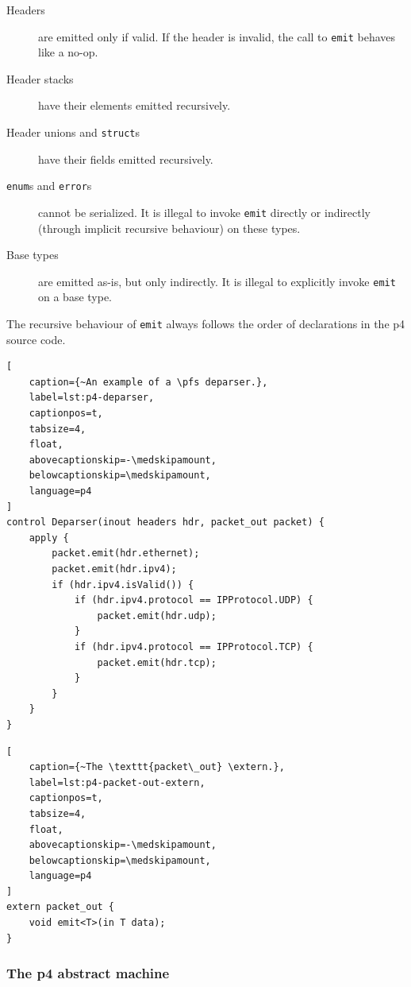 \begin{description}
	\item[Headers] are emitted only if valid. If the header is invalid, the call to
	\texttt{emit} behaves like a no-op.

	\item[Header stacks] have their elements emitted recursively.

	\item[Header unions and \texttt{struct}s] have their fields emitted
	recursively.

	\item[\texttt{enum}s and \texttt{error}s] cannot be serialized. It is
	illegal to invoke \texttt{emit} directly or indirectly (through implicit
	recursive behaviour) on these types.

	\item[Base types] are emitted as-is, but only indirectly. It is illegal to
	explicitly invoke \texttt{emit} on a base type.
\end{description}

The recursive behaviour of \texttt{emit} always follows the order of
declarations in the \acrshort{p4} source code.

\begin{lstlisting}[
	caption={~An example of a \pfs deparser.},
	label=lst:p4-deparser,
	captionpos=t,
	tabsize=4,
	float,
	abovecaptionskip=-\medskipamount,
	belowcaptionskip=\medskipamount,
	language=p4
]
control Deparser(inout headers hdr, packet_out packet) {
	apply {
		packet.emit(hdr.ethernet);
		packet.emit(hdr.ipv4);
		if (hdr.ipv4.isValid()) {
			if (hdr.ipv4.protocol == IPProtocol.UDP) {
				packet.emit(hdr.udp);
			}
			if (hdr.ipv4.protocol == IPProtocol.TCP) {
				packet.emit(hdr.tcp);
			}
		}
	}
}
\end{lstlisting}

\begin{lstlisting}[
	caption={~The \texttt{packet\_out} \extern.},
	label=lst:p4-packet-out-extern,
	captionpos=t,
	tabsize=4,
	float,
	abovecaptionskip=-\medskipamount,
	belowcaptionskip=\medskipamount,
	language=p4
]
extern packet_out {
	void emit<T>(in T data);
}
\end{lstlisting}


\subsubsection*{The \acrshort{p4} abstract machine}

